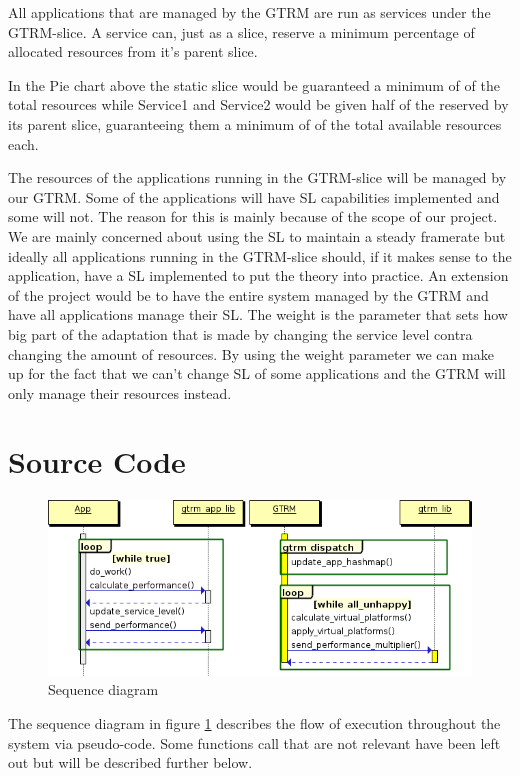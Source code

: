 \documentclass[nobiblatex]{LTHthesis}
\begin{document}
All applications that are managed by the GTRM are run as services under the GTRM-slice. A service can, just as a slice, reserve a minimum percentage of allocated resources from it’s parent slice.

In the Pie chart above the static slice would be guaranteed a minimum of  of the total resources while Service1 and Service2 would be given half of the  reserved by its parent slice, guaranteeing  them a minimum of  of the total available resources each.

The resources of the applications running in the GTRM-slice will be managed by our GTRM. Some of the applications will have SL capabilities implemented and some will not. The reason for this is mainly because of the scope of our project. We are mainly concerned about using the SL to maintain a steady framerate but ideally all applications running in the GTRM-slice should, if it makes sense to the application, have a SL implemented to put the theory into practice. An extension of the project would be to have the entire system managed by the GTRM and have all applications manage their SL. The weight is the parameter that sets how big part of the adaptation that is made by changing the service level contra changing the amount of resources. By using the weight parameter we can make up for the fact that we can’t change SL of some applications and the GTRM will only manage their resources instead. 

\section{Source Code}
\begin{figure}
    \centering
    \includegraphics[width=\textwidth]{diag.png}
    \caption{Sequence diagram}
    \label{fig:sdiag}
\end{figure}
The sequence diagram in figure \ref{fig:sdiag} describes the flow of execution throughout the system via pseudo-code. Some functions call that are not relevant have been left out but will be described further below. 
\end{document}

